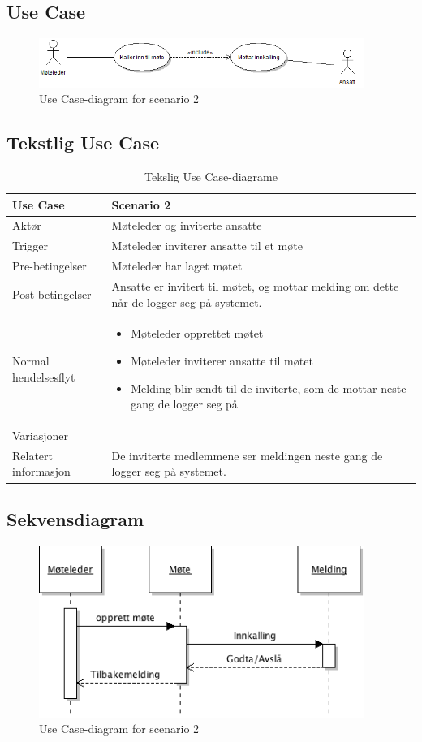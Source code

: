 \subsection{Use Case}
\begin{figure}[H]
\label{fig:uc2}
\includegraphics[width=400px]{ucs2.png}
\caption{Use Case-diagram for scenario 2}
\end{figure}

\subsection{Tekstlig Use Case}
\begin{table}[H]
\centering
\label{tab:tuc2}
\begin{tabular}{| l | L{4in} |}
\hline
Use Case & Scenario 2 \\
\hline
Aktør & Møteleder og inviterte ansatte \\
\hline
Trigger & Møteleder inviterer ansatte til et møte \\
\hline
Pre-betingelser & Møteleder har laget møtet \\
\hline
Post-betingelser & Ansatte er invitert til møtet, og mottar melding om dette når de logger seg på systemet. \\
\hline
Normal hendelsesflyt & 
\begin{minipage}{4in}
\vskip 4pt
\begin{itemize}
\item Møteleder opprettet møtet
\item Møteleder inviterer ansatte til møtet
\item Melding blir sendt til de inviterte, som de mottar neste gang de logger seg på
\end{itemize}
\vskip 4pt
\end{minipage}
 \\
\hline
Variasjoner & \\
\hline
Relatert informasjon & De inviterte medlemmene ser meldingen neste gang de logger seg på systemet. \\
\hline
\end{tabular}
\caption{Tekslig Use Case-diagrame}
\end{table}

\subsection{Sekvensdiagram}
\begin{figure}[H]
\label{fig:sek2}
\includegraphics[width=400px]{sekvens2.png}
\caption{Use Case-diagram for scenario 2}
\end{figure}